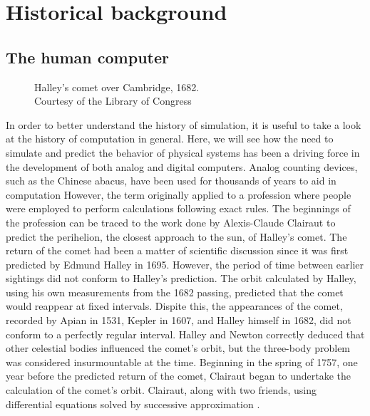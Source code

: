 \documentclass[\rootfolder/main.tex]{subfiles}
\begin{document}
\chapter{Historical background} %

\label{Chapter01} %

\section{The human computer}

\begin{figure}[ht]
    \caption[Halley's comet over Cambridge, 1682]
        {Halley's comet over Cambridge, 1682. \\ Courtesy of the Library of Congress\label{fig:comet}}
\end{figure}

In order to better understand the history of simulation, it is useful to take a look at the history of computation in general.
Here, we will see how the need to simulate and predict the behavior of physical systems has been a driving force in the development of both analog and digital computers.
Analog counting devices, such as the Chinese abacus, have been used for thousands of years to aid in computation
However, the term originally applied to a profession where people were employed to perform calculations following exact rules.
The beginnings of the profession can be traced to the work done by Alexis-Claude Clairaut to predict the perihelion, the closest approach to the sun, of Halley's comet.
The return of the comet had been a matter of scientific discussion since it was first predicted by Edmund Halley in 1695.
However, the period of time between earlier sightings did not conform to Halley's prediction.
The orbit calculated by Halley, using his own measurements from the 1682 passing, predicted that the comet would reappear at fixed intervals.
Dispite this, the appearances of the comet, recorded by Apian in 1531, Kepler in 1607, and Halley himself in 1682, did not conform to a perfectly regular interval.
Halley and Newton correctly deduced that other celestial bodies influenced the comet's orbit, but the three-body problem was considered insurmountable at the time.
Beginning in the spring of 1757, one year before the predicted return of the comet, Clairaut began to undertake the calculation of the comet's orbit.
Clairaut, along with two friends, using differential equations solved by successive approximation \cite{wilson1993}.
\end{document}
